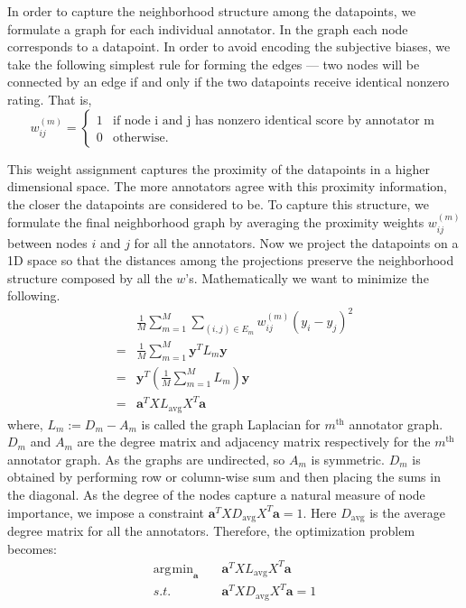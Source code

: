 \documentclass{article} \usepackage{nips14submit_e,times}
\DeclareMathOperator*{\argmin}{\arg\!\min}
\begin{document}
In order to capture the neighborhood structure among the datapoints, we formulate a graph for each individual annotator. In the graph each node corresponds to a datapoint. In order to avoid encoding the subjective biases, we take the following simplest rule for forming the edges --- two nodes will be connected by an edge if and only if the two datapoints receive identical nonzero rating.  That is,
\begin{equation}
	w_{ij}^{(m)} = 
	\begin{cases}
		1 & \text{if node i and j has nonzero identical score by annotator m} \\
   		0 & \text{otherwise}.
	\end{cases}
	\label{eq:graphweight}
\end{equation}

This weight assignment captures the proximity of the datapoints in a higher dimensional space. The more annotators agree with this proximity information, the closer the datapoints are considered to be. To capture this structure, we formulate the final neighborhood graph by averaging the proximity weights $w_{ij}^{(m)}$ between nodes $i$ and $j$ for all the annotators. Now we project the datapoints on a 1D space so that the distances among the projections preserve the neighborhood structure composed by all the $w$'s. Mathematically we want to minimize the following. 
\begin{equation}	
	\begin{split}
		 & \frac{1}{M}\sum_{m=1}^{M}\sum_{(i,j)\in E_m} w_{ij}^{(m)}(y_i - y_j)^2 \\
		= & \frac{1}{M}\sum_{m=1}^{M}\mathbf{y}^T L_m \mathbf{y}\\
		= & \mathbf{y}^T \left( \frac{1}{M}\sum_{m=1}^{M} L_m \right) \mathbf{y}\\
		= & \mathbf{a}^T X L_{\text{avg}} X^T \mathbf{a}
		\label{eq:ObjFun}
	\end{split}
\end{equation}
where, $L_m := D_m - A_m$ is called the graph Laplacian for $m^{\text{th}}$ annotator graph. $D_m$ and $A_m$ are the degree matrix and adjacency matrix respectively for the $m^{\text{th}}$ annotator graph. As the graphs are undirected, so $A_m$ is symmetric. $D_m$ is obtained by performing row or column-wise sum and then placing the sums in the diagonal. As the degree of the nodes capture a natural measure of node importance, we impose a constraint $\mathbf{a}^TX D_{\text{avg}} X^T \mathbf{a} = 1$. Here $D_{\text{avg}}$ is the average degree matrix for all the annotators. Therefore, the optimization problem becomes:
\begin{equation}
\begin{split}
\argmin_{\mathbf{a}} \quad & \mathbf{a}^T X L_{\text{avg}} X^T \mathbf{a}\\
s.t. \quad & \mathbf{a}^TX D_{\text{avg}} X^T \mathbf{a} = 1
\end{split}
\label{eq:Optimization}
\end{equation}
\end{document}
